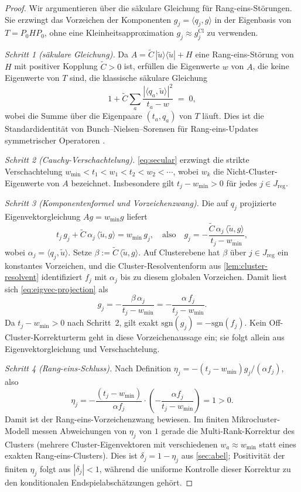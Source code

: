 \documentclass[12pt,a4paper]{article}
\theoremstyle{definition}
\theoremstyle{remark}
\newcommand{\Cl}{\mathrm{Cl}}
\newcommand{\reg}{\mathrm{reg}}
\newcommand{\sgn}{\mathrm{sgn}}
\newcommand{\ip}[2]{\langle #1, #2 \rangle}
\newcommand{\utilde}{\tilde{u}}
\newcommand{\Ctilde}{\tilde{C}}
\newcommand{\wmin}{w_{\min}}
\begin{document}
\begin{proof}
Wir argumentieren über die säkulare Gleichung für Rang-eins-Störungen.
Sie erzwingt das Vorzeichen der Komponenten $g_j = \ip{q_j}{g}$ in der
Eigenbasis von $T=P_0HP_0$, ohne eine Kleinheitsapproximation
$g_j \approx g_j^{\Cl}$ zu verwenden.

\emph{Schritt 1 (säkulare Gleichung).}
Da $A = \Ctilde\,|\utilde\rangle\langle\utilde| + H$ eine Rang-eins-Störung
von $H$ mit positiver Kopplung $\Ctilde>0$ ist, erfüllen die Eigenwerte $w$
von $A$, die keine Eigenwerte von $T$ sind, die klassische säkulare Gleichung
\begin{equation}
\label{eq:secular}
1 + \Ctilde \sum_a \frac{|\ip{q_a}{\utilde}|^2}{t_a - w}
\;=\; 0,
\end{equation}
wobei die Summe über die Eigenpaare $(t_a,q_a)$ von $T$ läuft. Dies ist
die Standardidentität von Bunch--Nielsen--Sorensen für Rang-eins-Updates
symmetrischer Operatoren \cite[Sec.~8.5]{GolubVanLoan2013}.

\emph{Schritt 2 (Cauchy-Verschachtelung).}
\eqref{eq:secular} erzwingt die strikte Verschachtelung
$\wmin < t_1 < w_1 < t_2 < w_2 < \cdots$, wobei $w_k$ die
Nicht-Cluster-Eigenwerte von $A$ bezeichnet. Insbesondere gilt
$t_j-\wmin>0$ für jedes $j\in J_{\reg}$.

\emph{Schritt 3 (Komponentenformel und Vorzeichenzwang).}
Die auf $q_j$ projizierte Eigenvektorgleichung $Ag=\wmin g$ liefert
\begin{equation}
\label{eq:eigvec-projection}
t_j\,g_j + \Ctilde\,\alpha_j\,\ip{\utilde}{g}
  = \wmin\,g_j,
\quad\text{also}\quad
g_j = -\frac{\Ctilde\,\alpha_j\,\ip{\utilde}{g}}{t_j-\wmin},
\end{equation}
wobei $\alpha_j=\ip{q_j}{\utilde}$. Setze
$\beta:=\Ctilde\,\ip{\utilde}{g}$. Auf Clusterebene hat $\beta$ über
$j\in J_{\reg}$ ein konstantes Vorzeichen, und die Cluster-Resolventenform
aus \cref{lem:cluster-resolvent} identifiziert $f_j$ mit $\alpha_j$ bis zu
diesem globalen Vorzeichen. Damit liest sich \eqref{eq:eigvec-projection} als
\[
g_j = -\frac{\beta\,\alpha_j}{t_j-\wmin}
    = -\frac{\alpha\,f_j}{t_j-\wmin}.
\]
Da $t_j-\wmin>0$ nach Schritt~2, gilt exakt
$\sgn(g_j)=-\sgn(f_j)$. Kein Off-Cluster-Korrekturterm geht in diese
Vorzeichenaussage ein; sie folgt allein aus Eigenvektorgleichung und
Verschachtelung.

\emph{Schritt 4 (Rang-eins-Schluss).}
Nach Definition
$\eta_j = -(t_j-\wmin)g_j/(\alpha f_j)$, also
\[
\eta_j
  = -\frac{(t_j-\wmin)}{\alpha f_j}
    \cdot\left(-\frac{\alpha f_j}{t_j-\wmin}\right)
  = 1 > 0.
\]
Damit ist der Rang-eins-Vorzeichenzwang bewiesen. Im finiten
Mikrocluster-Modell messen Abweichungen von $\eta_j$ von $1$ gerade die
Multi-Rank-Korrektur des Clusters (mehrere Cluster-Eigenvektoren mit
verschiedenen $w_a\approx\wmin$ statt eines exakten Rang-eins-Clusters).
Dies ist $\delta_j=1-\eta_j$ aus \cref{sec:abel}; Positivität der finiten
$\eta_j$ folgt aus $|\delta_j|<1$, während die uniforme Kontrolle dieser
Korrektur zu den konditionalen Endspielabschätzungen gehört.
\end{proof}
\end{document}
